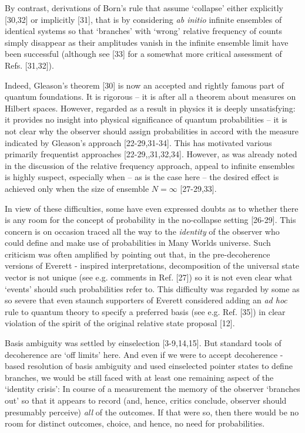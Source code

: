 \documentclass[aps,twocolumn,pra,epsfig]{revtex4}
\begin{document}
By contrast, derivations of Born's rule that assume `collapse' either
explicitly [30,32] or implicitly [31], that is by considering {\it ab initio} infinite 
ensembles of identical systems so that `branches' with `wrong' relative
frequency of counts simply disappear as their amplitudes vanish in 
the infinite ensemble limit have been successful (although see [33]
for a somewhat more critical assessment of Refs. [31,32]). 

Indeed, Gleason's theorem [30] is now an accepted and rightly famous 
part of quantum foundations. It is rigorous -- it is after all a theorem about 
measures on Hilbert spaces. However, regarded as a result in physics 
it is deeply unsatisfying: it provides no insight into physical significance
of quantum probabilities -- it is not clear why the observer should assign 
probabilities in accord with the measure indicated by Gleason's 
approach [22-29,31-34]. This has motivated various primarily frequentist 
approaches [22-29,,31,32,34]. However, as was already noted in 
the discussion of the relative frequency approach, appeal to infinite
ensembles is highly suspect, especially when -- as is the case here -- the
desired effect is achieved only when the size of ensemble $N = \infty$ [27-29,33].

In view of these difficulties, some have even expressed doubts as to whether
there is any room for the concept of probability in the no-collapse setting
[26-29]. This concern is on occasion traced all the way to the {\it identity}
of the observer who could define and make use of probabilities in Many Worlds
universe. Such criticism was often amplified by pointing out that,
in the pre-decoherence versions of Everett - inspired interpretations,
decomposition of the universal state vector is not unique (see e.g. comments
in Ref. [27]) so it is not even clear what `events' should such probabilities
refer to. This difficulty was regarded by some as so severe
that even staunch supporters of Everett considered adding an {\it ad hoc} rule
to quantum theory to specify a preferred basis (see e.g. Ref. [35]) in clear
violation of the spirit of the original relative state proposal [12].

Basis ambiguity was settled by einselection [3-9,14,15]. But standard tools of
decoherence are `off limits' here. And even if we were to accept decoherence -
based resolution of basis ambiguity and used einselected pointer states to
define branches, we would be still faced with at least one remaining aspect of
the `identity crisis': In course of a measurement the memory of the observer
`branches out' so that it appears to record (and, hence, critics conclude,
observer should presumably perceive) {\it all} of the outcomes. If that were so,
then there would be no room for distinct outcomes, choice, and hence, no need
for probabilities.
\end{document}
